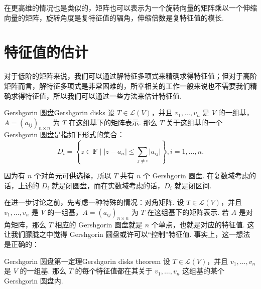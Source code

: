 在更高维的情况也是类似的，矩阵也可以表示为一个旋转向量的矩阵乘以一个伸缩向量的矩阵，旋转角度是复特征值的辐角，伸缩倍数是复特征值的模长.

\section{特征值的估计}

对于低阶的矩阵来说，我们可以通过解特征多项式来精确求得特征值；但对于高阶矩阵而言，解特征多项式是非常困难的，所幸相关的工作一般来说也不需要我们精确求得特征值，所以我们可以通过一些方法来估计特征值.

\begin{definition}{Gershgorin 圆盘}{Gershgorin disks}
    设 $T \in \mathcal{L}(V)$，并且 $v_1, \ldots, v_n$ 是 $V$ 的一组基，$A = (a_{ij})_{n \times n}$ 为 $T$ 在这组基下的矩阵表示. 那么 $T$ 关于这组基的一个 Gershgorin 圆盘是指如下形式的集合：
    \[ D_i = \left\{z \in \mathbf{F} \mid \lvert z - a_{ii} \rvert \leqslant \sum_{j \neq i} \lvert a_{ij} \rvert\right\}, i = 1, \ldots, n. \]
\end{definition}

因为有 $n$ 个对角元可供选择，所以 $T$ 共有 $n$ 个 Gershgorin 圆盘. 在复数域考虑的话，上述的 $D_i$ 就是闭圆盘，而在实数域考虑的话，$D_i$ 就是闭区间.

在进一步讨论之前，先考虑一种特殊的情况：对角矩阵. 设 $T \in \mathcal{L}(V)$，并且 $v_1, \ldots, v_n$ 是 $V$ 的一组基，$A = (a_{ij})_{n \times n}$ 为 $T$ 在这组基下的矩阵表示. 若 $A$ 是对角矩阵，那么 $T$ 相应的 Gershgorin 圆盘就是 $n$ 个单点，也就是对应的特征值. 这让我们朦胧之中觉得 Gershgorin 圆盘或许可以“控制”特征值. 事实上，这一想法是正确的：

\begin{theorem}{Gershgorin 圆盘第一定理}{Gershgorin disks theorem}
    设 $T \in \mathcal{L}(V)$，并且 $v_1, \ldots, v_n$ 是 $V$ 的一组基. 那么 $T$ 的每个特征值都在其关于 $v_1, \ldots, v_n$ 这组基的某个 Gershgorin 圆盘内.
\end{theorem}

